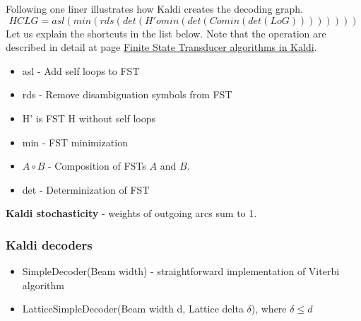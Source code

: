 Following one liner illustrates how Kaldi creates the decoding graph. 
\begin{equation}
   HCLG = asl(min(rds(det(H' o min(det(C o min(det(L o G)))))))) 
\end{equation}
Let us explain the shortcuts in the list below. Note that the operation are described in detail
at page \href{http://kaldi.sourceforge.net/fst_algo.html#fst_algo_stochastic} {Finite State Transducer algorithms in Kaldi}. 
\begin{itemize}
    \item asl - Add self loops to FST
    \item rds - Remove disambiguation symbols from FST
    \item H' is FST H without self loops
    \item min - FST minimization
    \item $A\circ B$  - Composition of FSTs $A$ and $B$.
    \item det - Determinization of FST
\end{itemize}

{\bf Kaldi stochasticity} - weights of outgoing arcs sum to 1.


\subsubsection*{Kaldi decoders} %
\begin{itemize}
    \item SimpleDecoder(Beam width) - straightforward implementation of Viterbi algorithm
    \item LatticeSimpleDecoder(Beam width d, Lattice delta $\delta$), where $ \delta \le d$

\end{itemize}


